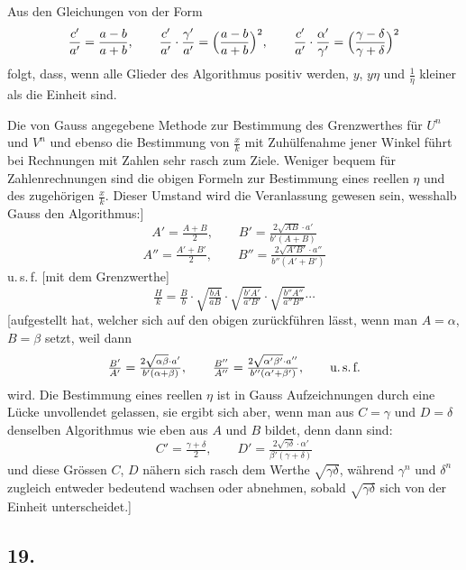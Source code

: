 \documentclass[10pt,a4paper]{article}
\begin{document}
Aus den Gleichungen von der Form
\[
\frac{c'}{a'} = \frac{a-b}{a+b}, \qquad
\frac{c'}{a'}\cdot\frac{\gamma'}{a'} = \Bigl(\frac{a-b}{a+b}\Bigr)^2, \qquad
\frac{c'}{a'}\cdot\frac{\alpha'}{\gamma'} = \Bigl(\frac{\gamma-\delta}{\gamma+\delta}\Bigr)^2
\]
folgt, dass, wenn alle Glieder des Algorithmus positiv werden,
$y$, $y\eta$ und $\tfrac{1}{\eta}$ kleiner als die Einheit sind.

Die von Gauss angegebene Methode zur Bestimmung des Grenzwerthes f\"ur
$U^n$ und $V^n$ und ebenso die Bestimmung von $\tfrac{x}{k}$ mit
Zuh\"ulfenahme jener Winkel f\"uhrt bei Rechnungen mit Zahlen sehr rasch
zum Ziele. Weniger bequem f\"ur Zahlenrechnungen sind die obigen Formeln
zur Bestimmung eines reellen $\eta$ und des zugeh\"origen $\tfrac{x}{k}$.
Dieser Umstand wird die Veranlassung gewesen sein, wesshalb Gauss den
Algorithmus:]
\[
A' = \tfrac{A+B}{2}, \qquad B' = \tfrac{2\sqrt{AB}\cdot a'}{b'(A+B)}
\]
\[
A'' = \tfrac{A'+B'}{2}, \qquad B'' = \tfrac{2\sqrt{A'B'}\cdot a''}{b''(A'+B')}
\]
u.\,s.\,f. [mit dem Grenzwerthe]
\[
\tfrac{H}{k} = \tfrac{B}{b}\cdot\sqrt{\tfrac{bA}{aB}}\cdot
              \sqrt{\tfrac{b'A'}{a'B'}}\cdot
              \sqrt{\tfrac{b''A''}{a''B''}}\cdots
\]
[aufgestellt hat, welcher sich auf den obigen zur\"uckf\"uhren l\"asst,
wenn man $A=\alpha$, $B=\beta$ setzt, weil dann
\[
\tfrac{B'}{A'} = \tfrac{2\sqrt{\alpha\beta}\cdot a'}{b'(\alpha+\beta)}, \qquad
\tfrac{B''}{A''} = \tfrac{2\sqrt{\alpha'\beta'}\cdot a''}{b''(\alpha'+\beta')}, \qquad \text{u.\,s.\,f.}
\]
wird. Die Bestimmung eines reellen $\eta$ ist in Gauss Aufzeichnungen durch
eine L\"ucke unvollendet gelassen, sie ergibt sich aber, wenn man aus
$C=\gamma$ und $D=\delta$ denselben Algorithmus wie eben aus $A$ und $B$ bildet,
denn dann sind:
\[
C' = \tfrac{\gamma+\delta}{2}, \qquad
D' = \tfrac{2\sqrt{\gamma\delta}\cdot\alpha'}{\beta'(\gamma+\delta)}
\]
und diese Gr\"ossen $C$, $D$ n\"ahern sich rasch dem Werthe
$\sqrt{\gamma\delta}$, w\"ahrend $\gamma^n$ und $\delta^n$ zugleich
entweder bedeutend wachsen oder abnehmen, sobald $\sqrt{\gamma\delta}$
sich von der Einheit unterscheidet.]


\subsection*{19.}
\end{document}
